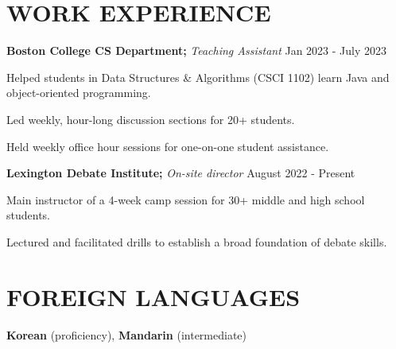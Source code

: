 \documentclass[11pt]{article}
\begin{document}
\section*{WORK EXPERIENCE}
\textbf{Boston College CS Department;} \textit{Teaching Assistant} \hfill Jan 2023 - July 2023 
\begin{sublist}
	\item Helped students in Data Structures \& Algorithms (CSCI 1102) learn Java and object-oriented programming. 
	\item Led weekly, hour-long discussion sections for 20+ students. 
	\item Held weekly office hour sessions for one-on-one student assistance.
\end{sublist}

\raggedright
\textbf{Lexington Debate Institute;} \textit{On-site director} \hfill August 2022 - Present \\
\begin{sublist}
	\item Main instructor of a 4-week camp session for 30+ middle and high school students. 
	\item Lectured and facilitated drills to establish a broad foundation of debate skills.
\end{sublist}

\section*{FOREIGN LANGUAGES}
\textbf{Korean} (proficiency), \textbf{Mandarin} (intermediate)
\end{document}
